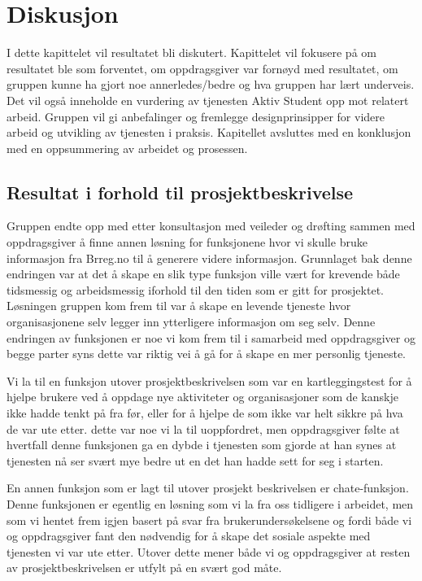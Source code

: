 \cleardoublepage
\chapter{Diskusjon}
\label{chap:discussion} 

I dette kapittelet vil resultatet bli diskutert. Kapittelet vil fokusere på om resultatet ble som forventet, om oppdragsgiver var fornøyd med resultatet, om gruppen kunne ha gjort noe annerledes/bedre og hva gruppen har lært underveis. Det vil også inneholde en vurdering av tjenesten Aktiv Student opp mot relatert arbeid. Gruppen vil gi anbefalinger og fremlegge designprinsipper for videre arbeid og utvikling av tjenesten i praksis. Kapitellet avsluttes med en konklusjon med en oppsummering av arbeidet og prosessen.

\section{Resultat i forhold til prosjektbeskrivelse}

Gruppen endte opp med etter konsultasjon med veileder og drøfting sammen med oppdragsgiver å finne annen løsning for funksjonene hvor vi skulle bruke informasjon fra Brreg.no til å generere videre informasjon. Grunnlaget bak denne endringen var at det å skape en slik type funksjon ville vært for krevende både tidsmessig og arbeidsmessig iforhold til den tiden som er gitt for prosjektet. Løsningen gruppen kom frem til var å skape en levende tjeneste hvor organisasjonene selv legger inn ytterligere informasjon om seg selv. Denne endringen av funksjonen er noe vi kom frem til i samarbeid med oppdragsgiver og begge parter syns dette var riktig vei å gå for å skape en mer personlig tjeneste.

Vi la til en funksjon utover prosjektbeskrivelsen som var en kartleggingstest for å hjelpe brukere ved å oppdage nye aktiviteter og organisasjoner som de kanskje ikke hadde tenkt på fra før, eller for å hjelpe de som ikke var helt sikkre på hva de var ute etter. dette var noe vi la til uoppfordret, men oppdragsgiver følte at hvertfall denne funksjonen ga en dybde i tjenesten som gjorde at han synes at tjenesten nå ser svært mye bedre ut en det han hadde sett for seg i starten.

En annen funksjon som er lagt til utover prosjekt beskrivelsen er chate-funksjon. Denne funksjonen er egentlig en løsning som vi la fra oss tidligere i arbeidet, men som vi hentet frem igjen basert på svar fra brukerundersøkelsene og fordi både vi og oppdragsgiver fant den nødvendig for å skape det sosiale aspekte med tjenesten vi var ute etter. Utover dette mener både vi og oppdragsgiver at resten av prosjektbeskrivelsen er utfylt på en svært god måte.



